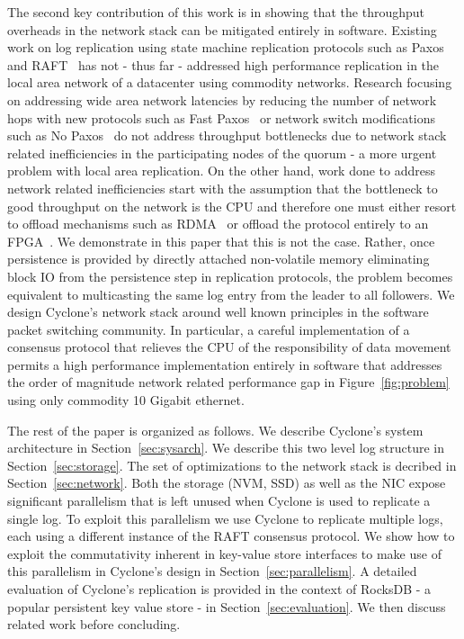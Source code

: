 \documentclass[pageno]{jpaper}
\begin{document}
The second key contribution of this work is in showing that the throughput
overheads in the network stack can be mitigated entirely in software. Existing
work on log replication using state machine replication protocols such as
Paxos~\cite{paxos} and RAFT~\cite{raft} has not - thus far - addressed high
performance replication in the local area network of a datacenter using
commodity networks.  Research focusing on addressing wide area network latencies
by reducing the number of network hops with new protocols such as Fast
Paxos~\cite{fast-paxos} or network switch modifications such as No
Paxos~\cite{nopaxos} do not address throughput bottlenecks due to network stack
related inefficiencies in the participating nodes of the quorum - a more urgent
problem with local area replication. On the other hand, work done to address
network related inefficiencies start with the assumption that the bottleneck to
good throughput on the network is the CPU and therefore one must either resort
to offload mechanisms such as RDMA~\cite{dare, farm, faast} or offload the
protocol entirely to an FPGA~\cite{consensus_box}. We demonstrate in this paper
that this is not the case. Rather, once persistence is provided by directly
attached non-volatile memory eliminating block IO from the persistence step in
replication protocols, the problem becomes equivalent to multicasting the same
log entry from the leader to all followers. We design Cyclone's network stack
around well known principles in the software packet switching community. In
particular, a careful implementation of a consensus protocol that relieves the
CPU of the responsibility of data movement permits a high performance
implementation entirely in software that addresses the order of magnitude
network related performance gap in Figure~\ref{fig:problem} using only commodity
10 Gigabit ethernet.

The rest of the paper is organized as follows. We describe Cyclone's system
architecture in Section~\ref{sec:sysarch}. We describe this two level log
structure in Section~\ref{sec:storage}. The set of optimizations to the network
stack is decribed in Section~\ref{sec:network}. Both the storage (NVM, SSD) as
well as the NIC expose significant parallelism that is left unused when Cyclone
is used to replicate a single log. To exploit this parallelism we use Cyclone to
replicate multiple logs, each using a different instance of the RAFT consensus
protocol. We show how to exploit the commutativity inherent in key-value store
interfaces to make use of this parallelism in Cyclone's design in
Section~\ref{sec:parallelism}.  A detailed evaluation of Cyclone's replication
is provided in the context of RocksDB - a popular persistent key value store -
in Section~\ref{sec:evaluation}. We then discuss related work before concluding.
\end{document}
